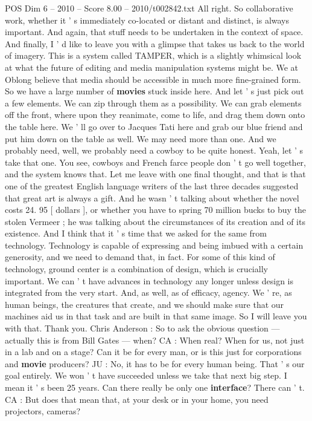 \begin{textsample}{POS Dim 6 – 2010 – Score 8.00 – 2010/t002842.txt}
All right.
So collaborative work, whether it ' s immediately co-located or distant and distinct, is always important.
And again, that stuff needs to be undertaken in the context of space.
And finally, I ' d like to leave you with a glimpse that takes us back to the world of imagery.
This is a system called TAMPER, which is a slightly whimsical look at what the future of editing and media manipulation systems might be.
We at Oblong believe that media should be accessible in much more fine-grained form.
So we have a large number of \textbf{movies} stuck inside here.
And let ' s just pick out a few elements.
We can zip through them as a possibility.
We can grab elements off the front, where upon they reanimate, come to life, and drag them down onto the table here.
We ' ll go over to Jacques Tati here and grab our blue friend and put him down on the table as well.
We may need more than one.
And we probably need, well, we probably need a cowboy to be quite honest.
Yeah, let ' s take that one.
You see, cowboys and French farce people don ' t go well together, and the system knows that.
Let me leave with one final thought, and that is that one of the greatest English language writers of the last three decades suggested that great art is always a gift.
And he wasn ' t talking about whether the novel costs 24. 95 [ dollars ], or whether you have to spring 70 million bucks to buy the stolen Vermeer ; he was talking about the circumstances of its creation and of its existence.
And I think that it ' s time that we asked for the same from technology.
Technology is capable of expressing and being imbued with a certain generosity, and we need to demand that, in fact.
For some of this kind of technology, ground center is a combination of design, which is crucially important.
We can ' t have advances in technology any longer unless design is integrated from the very start.
And, as well, as of efficacy, agency.
We ' re, as human beings, the creatures that create, and we should make sure that our machines aid us in that task and are built in that same image.
So I will leave you with that.
Thank you.
Chris Anderson : So to ask the obvious question — actually this is from Bill Gates — when?
CA : When real?
When for us, not just in a lab and on a stage?
Can it be for every man, or is this just for corporations and \textbf{movie} producers?
JU : No, it has to be for every human being.
That ' s our goal entirely.
We won ' t have succeeded unless we take that next big step.
I mean it ' s been 25 years.
Can there really be only one \textbf{interface}?
There can ' t.
CA : But does that mean that, at your desk or in your home, you need projectors, cameras?

\end{textsample}
